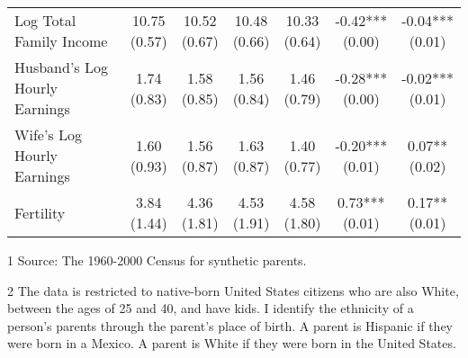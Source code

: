 \begin{table}[H]
{\begin{threeparttable}
\begin{tabular}[t]{>{\raggedright\arraybackslash}p{5cm}cccccc}
Log Total Family Income & \specialcell{10.75\\(0.57)} & \specialcell{10.52\\(0.67)} & \specialcell{10.48\\(0.66)} & \specialcell{10.33\\(0.64)} & \specialcell{-0.42***\\(0.00)} & \specialcell{-0.04***\\(0.01)}\\
Husband's Log Hourly Earnings & \specialcell{1.74\\(0.83)} & \specialcell{1.58\\(0.85)} & \specialcell{1.56\\(0.84)} & \specialcell{1.46\\(0.79)} & \specialcell{-0.28***\\(0.00)} & \specialcell{-0.02***\\(0.01)}\\
\addlinespace
Wife's Log Hourly Earnings & \specialcell{1.60\\(0.93)} & \specialcell{1.56\\(0.87)} & \specialcell{1.63\\(0.87)} & \specialcell{1.40\\(0.77)} & \specialcell{-0.20***\\(0.01)} & \specialcell{0.07**\\(0.02)}\\
Fertility & \specialcell{3.84\\(1.44)} & \specialcell{4.36\\(1.81)} & \specialcell{4.53\\(1.91)} & \specialcell{4.58\\(1.80)} & \specialcell{0.73***\\(0.01)} & \specialcell{0.17**\\(0.01)}\\
\bottomrule
\end{tabular}
\begin{tablenotes}
\item[1] Source: The 1960-2000 Census for synthetic parents.
\item[2] The data is restricted to native-born United States citizens who are also White, between the ages of 25 and 40, and have kids. I identify the ethnicity of a person's parents through the parent's place of birth. A parent is Hispanic if they were born in a Mexico. A parent is White if they were born in the United States.
\end{tablenotes}
\end{threeparttable}}
\end{table}
